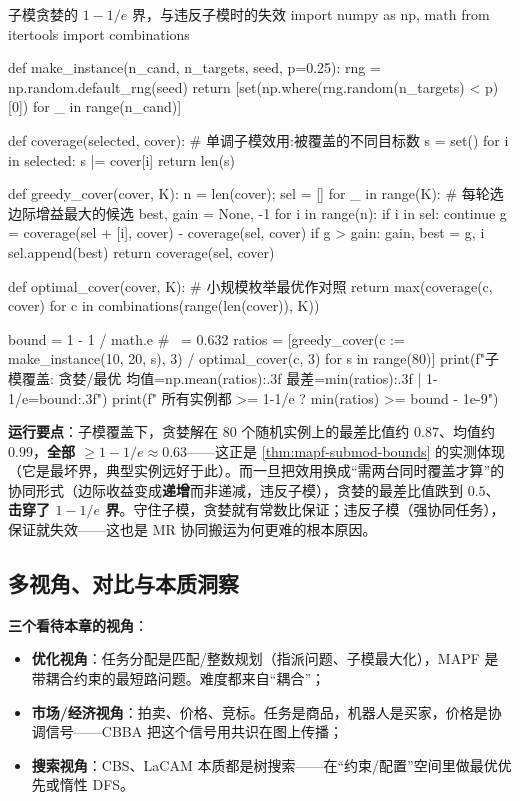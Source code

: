 \begin{codebox}[Python]{子模贪婪的 $1-1/e$ 界，与违反子模时的失效}
import numpy as np, math
from itertools import combinations

def make_instance(n_cand, n_targets, seed, p=0.25):
    rng = np.random.default_rng(seed)
    return [set(np.where(rng.random(n_targets) < p)[0]) for _ in range(n_cand)]

def coverage(selected, cover):                      # 单调子模效用:被覆盖的不同目标数
    s = set()
    for i in selected: s |= cover[i]
    return len(s)

def greedy_cover(cover, K):
    n = len(cover); sel = []
    for _ in range(K):                              # 每轮选边际增益最大的候选
        best, gain = None, -1
        for i in range(n):
            if i in sel: continue
            g = coverage(sel + [i], cover) - coverage(sel, cover)
            if g > gain: gain, best = g, i
        sel.append(best)
    return coverage(sel, cover)

def optimal_cover(cover, K):                         # 小规模枚举最优作对照
    return max(coverage(c, cover) for c in combinations(range(len(cover)), K))

bound = 1 - 1 / math.e                               # ~= 0.632
ratios = [greedy_cover(c := make_instance(10, 20, s), 3) / optimal_cover(c, 3) for s in range(80)]
print(f"子模覆盖: 贪婪/最优 均值={np.mean(ratios):.3f} 最差={min(ratios):.3f} | 1-1/e={bound:.3f}")
print(f"  所有实例都 >= 1-1/e ? {min(ratios) >= bound - 1e-9}")
\end{codebox}

\textbf{运行要点}：子模覆盖下，贪婪解在 $80$ 个随机实例上的最差比值约 $0.87$、均值约 $0.99$，\textbf{全部 $\ge 1-1/e\approx0.63$}——这正是 \cref{thm:mapf-submod-bounds} 的实测体现（它是最坏界，典型实例远好于此）。而一旦把效用换成“需两台同时覆盖才算”的协同形式（边际收益变成\textbf{递增}而非递减，违反子模），贪婪的最差比值跌到 $0.5$、\textbf{击穿了 $1-1/e$ 界}。守住子模，贪婪就有常数比保证；违反子模（强协同任务），保证就失效——这也是 MR 协同搬运为何更难的根本原因。

\subsection{多视角、对比与本质洞察}
\label{sec:mapf-submod-views}

\textbf{三个看待本章的视角}：

\begin{itemize}
  \item \textbf{优化视角}：任务分配是匹配/整数规划（指派问题、子模最大化），MAPF 是带耦合约束的最短路问题。难度都来自“耦合”；
  \item \textbf{市场/经济视角}：拍卖、价格、竞标。任务是商品，机器人是买家，价格是协调信号——CBBA 把这个信号用共识在图上传播；
  \item \textbf{搜索视角}：CBS、LaCAM 本质都是树搜索——在“约束/配置”空间里做最优优先或惰性 DFS。
\end{itemize}

